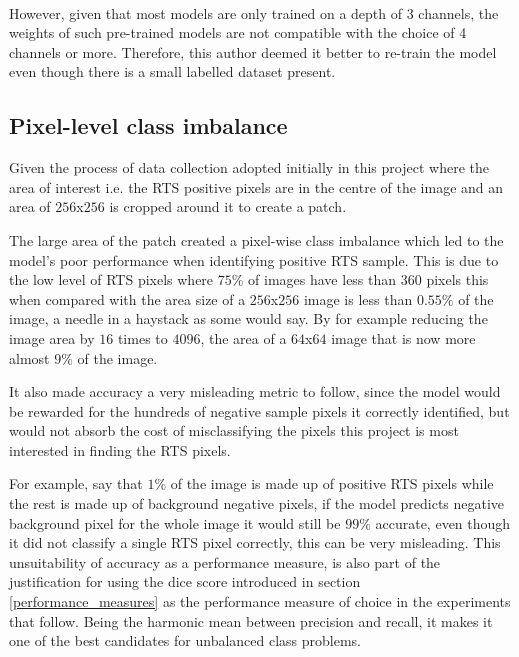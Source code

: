 \paragraph{}
However, given that most models are only trained on a depth of 3 channels, the weights of such pre-trained models are not compatible with the choice of 4 channels or more.
Therefore, this author deemed it better to re-train the model even though there is a small labelled dataset present.
\subsection{Pixel-level class imbalance} \label{class_imbalance}

Given the process of data collection adopted initially in this project where the area of interest i.e. the \gls{RTS} positive pixels are in the centre of the image and an area of $256$x$256$ is cropped around it to create a patch. 

The large area of the patch created a pixel-wise class imbalance which led to the model's poor performance when identifying positive \gls{RTS} sample. This is due to the low level of \gls{RTS} pixels where $75\%$ of images have less than $360$ pixels this when compared with the area size of a $256$x$256$ image is less than $0.55\%$ of the image, a needle in a haystack as some would say. By for example reducing the image area by $16$ times to $4096$, the area of a $64$x$64$ image that is now more almost $9\%$ of the image.

It also made accuracy a very misleading metric to follow, since the model would be rewarded for the hundreds of negative sample pixels it correctly identified, but would not absorb the cost of misclassifying the pixels this project is most interested in finding the \gls{RTS} pixels. 

For example, say that $1\%$ of the image is made up of positive \gls{RTS} pixels while the rest is made up of background negative pixels, if the model predicts negative background pixel for the whole image it would still be $99\%$ accurate, even though it did not classify a single \gls{RTS} pixel correctly, this can be very misleading.
This unsuitability of accuracy as a performance measure, is also part of the justification for using the dice score introduced in section \ref{performance_measures} as the performance measure of choice in the experiments that follow. Being the harmonic mean between precision and recall, it makes it one of the best candidates for unbalanced class problems.

